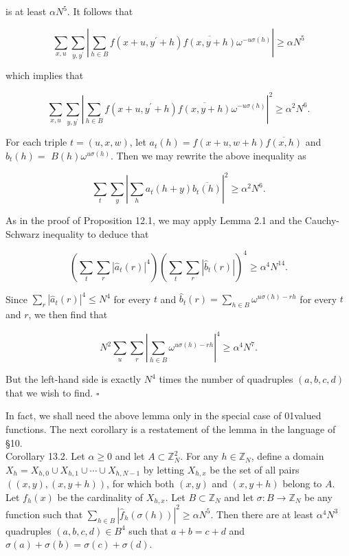 \documentclass[10pt]{article}
\begin{document}
is at least $\alpha N^{5}$. It follows that

$$
\sum_{x, u} \sum_{y, y^{\prime}}\left|\sum_{h \in B} f\left(x+u, y^{\prime}+h\right) \overline{f(x, y+h)} \omega^{-u \sigma(h)}\right| \geqslant \alpha N^{5}
$$

which implies that

$$
\sum_{x, u} \sum_{y, y^{\prime}}\left|\sum_{h \in B} f\left(x+u, y^{\prime}+h\right) \overline{f(x, y+h)} \omega^{-u \sigma(h)}\right|^{2} \geqslant \alpha^{2} N^{6} .
$$

For each triple $t=(u, x, w)$, let $a_{t}(h)=f(x+u, w+h) \overline{f(x, h)}$ and $b_{t}(h)=$ $B(h) \omega^{u \sigma(h)}$. Then we may rewrite the above inequality as

$$
\sum_{t} \sum_{y}\left|\sum_{h} a_{t}(h+y) \overline{b_{t}(h)}\right|^{2} \geqslant \alpha^{2} N^{6} .
$$

As in the proof of Proposition 12.1, we may apply Lemma 2.1 and the Cauchy-Schwarz inequality to deduce that

$$
\left(\sum_{t} \sum_{r}\left|\hat{a}_{t}(r)\right|^{4}\right)\left(\sum_{t} \sum_{r}\left|\hat{b}_{t}(r)\right|\right)^{4} \geqslant \alpha^{4} N^{14} .
$$

Since $\sum_{r}\left|\hat{a}_{t}(r)\right|^{4} \leqslant N^{4}$ for every $t$ and $\hat{b}_{t}(r)=\sum_{h \in B} \omega^{u \sigma(h)-r h}$ for every $t$ and $r$, we then find that

$$
N^{2} \sum_{u} \sum_{r}\left|\sum_{h \in B} \omega^{u \sigma(h)-r h}\right|^{4} \geqslant \alpha^{4} N^{7} .
$$

But the left-hand side is exactly $N^{4}$ times the number of quadruples $(a, b, c, d)$ that we wish to find. \(\square\)

In fact, we shall need the above lemma only in the special case of 01valued functions. The next corollary is a restatement of the lemma in the language of §10.\\
Corollary 13.2. Let $\alpha\geqslant0$ and let $A \subset \mathbb{Z}_{N}^{2}$. For any $h \in \mathbb{Z}_{N}$, define a domain $X_{h}=X_{h, 0} \cup X_{h, 1} \cup \cdots \cup X_{h, N-1}$ by letting $X_{h, x}$ be the set of all pairs $((x, y),(x, y+h))$, for which both $(x, y)$ and $(x, y+h)$ belong to $A$. Let $f_{h}(x)$ be the cardinality of $X_{h, x}$. Let $B \subset \mathbb{Z}_{N}$ and let $\sigma: B \rightarrow \mathbb{Z}_{N}$ be any function such that $\sum_{h \in B}\left|\hat{f}_{h}(\sigma(h))\right|^{2} \geqslant \alpha N^{5}$. Then there are at least $\alpha^{4} N^{3}$ quadruples $(a, b, c, d) \in B^{4}$ such that $a+b=c+d$ and $\sigma(a)+\sigma(b)=\sigma(c)+\sigma(d)$.
\end{document}
